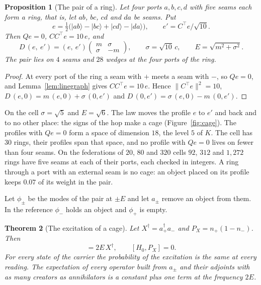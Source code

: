 \documentclass[11pt]{article}
\newtheorem{theorem}{Theorem}[section]
\newtheorem{proposition}[theorem]{Proposition}
\theoremstyle{definition}
\theoremstyle{remark}
\theoremstyle{plain}
\newcommand{\ket}[1]{\lvert #1\rangle}
\begin{document}
\begin{proposition}[The pair of a ring]
\label{prop:cage}
Let four ports $a,b,c,d$ with five seams each form a ring, that is, let
$ab$, $bc$, $cd$ and $da$ be seams. Put
\[
e=\tfrac12\bigl(\ket{ab}-\ket{bc}+\ket{cd}-\ket{da}\bigr),
\qquad e'=C^{\top}e/\sqrt{10}.
\]
Then $Qe=0$, $CC^{\top}e=10\,e$, and
\begin{equation}
D\,(e,\ e')=(e,\ e')
\begin{pmatrix}m&\sigma\\ \sigma&-m\end{pmatrix},
\qquad \sigma=\sqrt{10}\,c,\qquad E=\sqrt{m^2+\sigma^2}.
\label{eq:cage}
\end{equation}
The pair lies on $4$ seams and $28$ wedges at the four ports of the ring.
\end{proposition}

\begin{proof}
At every port of the ring a seam with $+$ meets a seam with $-$, so
$Qe=0$, and Lemma~\ref{lem:linegraph} gives $CC^{\top}e=10\,e$. Hence
$\lVert C^{\top}e\rVert^2=10$,
$D\,(e,0)=m\,(e,0)+\sigma\,(0,e')$ and
$D\,(0,e')=\sigma\,(e,0)-m\,(0,e')$.
\end{proof}

On the cell $\sigma=\sqrt5$ and $E=\sqrt6$. The law moves the profile $e$
to $e'$ and back and to no other place: the signs of the hop make a cage
(Figure~\ref{fig:cage}).
The profiles with $Qe=0$ form a space of dimension $18$, the level $5$ of
$K$. The cell has $30$ rings, their profiles span that space, and no
profile with $Qe=0$ lives on fewer than four seams. On the federations of
$20$, $80$ and $320$ cells $92$, $312$ and $1{,}272$ rings have five seams at
each of their ports, each checked in integers. A ring through a port with
an external seam is no cage: an object placed on its profile keeps $0.07$
of its weight in the pair.

Let $\phi_{\pm}$ be the modes of the pair at $\pm E$ and let $a_{\pm}$
remove an object from them. In the reference $\phi_-$ holds an object and
$\phi_+$ is empty.

\begin{theorem}[The excitation of a cage]
\label{thm:cage}
Let $X^{\dagger}=a_+^{\dagger}a_-$ and $P_X=n_+(1-n_-)$. Then
\begin{equation}
[H_0,X^{\dagger}]=2E\,X^{\dagger},\qquad[H_0,P_X]=0.
\label{eq:excitation}
\end{equation}
For every state of the carrier the probability of the excitation is the
same at every reading. The expectation of every operator built from
$a_{\pm}$ and their adjoints with as many creators as annihilators is a
constant plus one term at the frequency $2E$.
\end{theorem}
\end{document}
